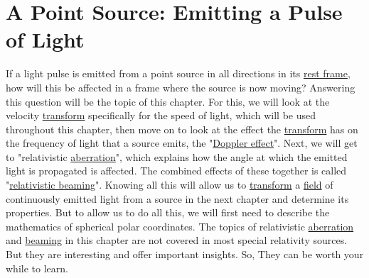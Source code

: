 \chapter{A Point Source: Emitting a Pulse of Light} \label{ch: A Point Source Emitting a Pulse of Light}




If a light pulse is emitted from a point source in all directions in its \hyperlink{def-proper-frame}{rest frame}, how will this be affected in a frame where the source is now moving?
Answering this question will be the topic of this chapter.
For this, we will look at the velocity \hyperlink{def-transform}{transform} specifically for the speed of light, which will be used throughout this chapter, then move on to look at the effect the \hyperlink{def-transform}{transform} has on the frequency of light that a source emits, the "\hyperlink{def-doppler-effect}{Doppler effect}".
Next, we will get to "relativistic \hyperlink{def-aberration}{aberration}", which explains how the angle at which the emitted light is propagated is affected.
The combined effects of these together is called "\hyperlink{def-relativistic-beaming}{relativistic beaming}".
Knowing all this will allow us to \hyperlink{def-transform}{transform} a \hyperlink{def-field}{field} of continuously emitted light from a source in the next chapter and determine its properties.
But to allow us to do all this, we will first need to describe the mathematics of spherical polar coordinates.
The topics of relativistic \hyperlink{def-aberration}{aberration} and \hyperlink{def-relativistic-beaming}{beaming} in this chapter are not covered in most special relativity sources.
But they are interesting and offer important insights.
So, They can be worth your while to learn.

